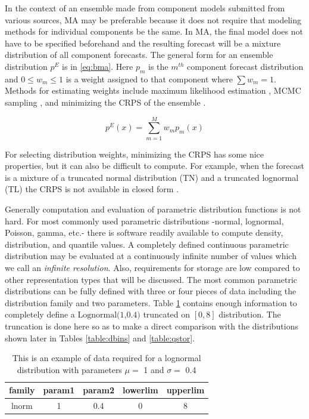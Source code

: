 \documentclass[11pt,notitlepage]{isuthesis}
\begin{document}
In the context of an ensemble made from component models submitted from various
sources,
MA may be preferable because it does not require that modeling methods for 
individual components be the same. 
In MA, the final model does not have to be specified
beforehand and the resulting forecast will be a mixture distribution
of all component forecasts. The general form for an ensemble distribution $p^E$
is in \eqref{eq:bma}. Here $p_m$ is the $m^{th}$ component forecast 
distribution and 
$0 \leq w_m \leq 1$ is a weight assigned to that component where $\sum w_m = 1$.
Methods for estimating weights include maximum likelihood estimation
\cite[]{raftery2005using}, MCMC 
sampling \cite[]{vrugt2008ensemble},
and minimizing the CRPS of the ensemble
\cite[]{baran2018combining}.

\begin{equation}
\label{eq:bma}
  p^E(x) = \sum_{m=1}^M w_mp_m(x)
\end{equation}


For selecting distribution weights, minimizing the CRPS has some nice 
properties, but it can also be
difficult to compute. For example, when the forecast is a mixture of a 
truncated normal distribution (TN) and a truncated lognormal (TL) the CRPS is 
not available in closed form \cite[]{baran2018combining}.

Generally computation and evaluation of parametric distribution functions is not 
hard. 
For most commonly used parametric distributions -normal, lognormal, Poisson,
gamma, etc.- there is software readily available to compute density, 
distribution, and quantile values. 
A completely defined continuous parametric distribution may be evaluated at a
continuously
infinite number of values which we call an \emph{infinite resolution}.
Also, requirements for storage are low 
compared to other representation types that will be discussed. The most common
parametric distributions can be fully defined with three or four pieces of data
including
the distribution family and two parameters. Table \ref{table:pstor} 
contains
enough information to completely define a $\mbox{Lognormal(1,0.4)}$ 
truncated on $[0,8]$ distribution. The truncation is done here so as to make a
direct comparison with the distributions shown later in Tables 
\ref{table:dbins} and \ref{table:qstor}.

\begin{table}[h!]
\begin{center}
\begin{minipage}{10cm}
\captionsetup{font=scriptsize}
\centering
 \begin{tabular}{|c c c c c|} 
 \hline
 family & param1 & param2 & lowerlim & upperlim\\ [0.5ex] 
 \hline
 lnorm & 1 & 0.4 & 0 & 8 \\ 
 \hline
 \end{tabular}
 \caption[Parametric distribution storage]{This is an example of data required
 for a lognormal 
 distribution with 
 parameters $\mu = $ 1 and $\sigma =$ 0.4}
 \label{table:pstor}
 \end{minipage}
 \end{center}
\end{table}
\end{document}
